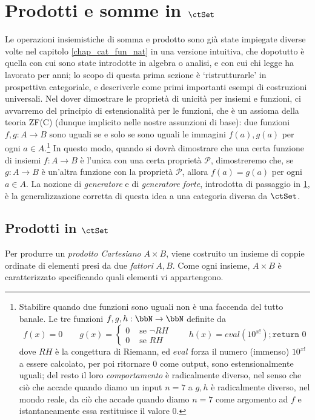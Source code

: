 \section{Prodotti e somme in \(\ctSet\)}
Le operazioni insiemistiche di somma e prodotto sono già state impiegate diverse volte nel capitolo \ref{chap_cat_fun_nat} in una versione intuitiva, che dopotutto è quella con cui sono state introdotte in algebra o analisi, e con cui chi legge ha lavorato per anni; lo scopo di questa prima sezione è `ristrutturarle' in prospettiva categoriale, e descriverle come primi importanti esempi di costruzioni universali. Nel dover dimostrare le proprietà di unicità per insiemi e funzioni, ci avvarremo del principio di estensionalità per le funzioni, che è un assioma della teoria \textsf{ZF(C)} (dunque implicito nelle nostre assunzioni di base): due funzioni	\(f,g \colon A\to B\) sono uguali se e solo se sono uguali le immagini \(f(a),g(a)\) per ogni \(a\in A\).\footnote{Stabilire quando due funzioni sono uguali non è una faccenda del tutto banale. Le tre funzioni $f,g,h : \bbN \to \bbN$ definite da
\[f(x)=0 \qquad 
g(x)=\begin{cases}
  0 & \text{ se } \lnot RH \\
  0 & \text{ se  } RH
\end{cases} \qquad 
h(x) = eval(10^{x!}) 
     ; \texttt{return } 0
\]
dove $RH$ è la congettura di Riemann, ed $eval$ forza il numero (immenso) $10^{x!}$ a essere calcolato, per poi ritornare $0$ come output, sono estensionalmente uguali; del resto il loro \emph{comportamento} è radicalmente diverso, nel senso che ciò che accade quando diamo un input $n=7$ a $g,h$ è radicalmente diverso, nel mondo reale, da ciò che accade quando diamo $n=7$ come argomento ad $f$ e istantaneamente essa restituisce il valore $0$.} In questo modo, quando si dovrà dimostrare che una certa funzione di insiemi \(f \colon A\to B\) è l'unica con una certa proprietà \(\mathcal{P}\), dimostreremo che, se \(g \colon A \to B\) è un'altra funzione con la proprietà \(\mathcal{P}\), allora \(f(a)=g(a)\) per ogni \(a\in A\). La nozione di \emph{generatore} e di \emph{generatore forte}, introdotta di passaggio in \ref{}, è la generalizzazione corretta di questa idea a una categoria diversa da $\ctSet$.
\subsection{Prodotti in \(\ctSet\)}\label{prod_in_Set}
Per produrre un \emph{prodotto Cartesiano} \(A\times B\), viene costruito un insieme di coppie ordinate di elementi presi da due \emph{fattori}  \(A,B\). Come ogni insieme, \(A\times B\) è caratterizzato specificando quali elementi vi appartengono. 

